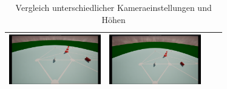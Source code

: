 \begin{table}[h!]
\begin{tabular}{|c|c|c|c|}
        \includegraphics[width=4cm]{img/unrealengine/h50_f120_w45.png} & 
        \includegraphics[width=4cm]{img/unrealengine/h75_f120_w45.png} \\
        \hline
    \end{tabular}
    \caption{Vergleich unterschiedlicher Kameraeinstellungen und Höhen}
\end{table}


